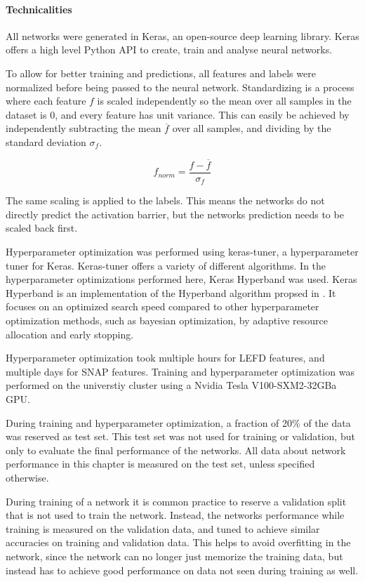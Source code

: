 \paragraph{Technicalities}

All networks were generated in Keras, an open-source deep learning library.
Keras offers a high level Python API to create, train and analyse neural networks.

To allow for better training and predictions, all features and labels were normalized before being passed to the neural network.
Standardizing is a process where each feature $f$ is scaled independently so the mean over all samples in the dataset is 0, 
and every feature has unit variance.
This can easily be achieved by independently subtracting the mean $\overline{f}$ over all samples, and dividing by the standard deviation $\sigma_f$.

$$
f_{norm} = \frac{f- \overline{f}}{\sigma_f}
$$

The same scaling is applied to the labels.
This means the networks do not directly predict the activation barrier, but the networks prediction needs to be scaled back first.

Hyperparameter optimization was performed using keras-tuner, a hyperparameter tuner for Keras.
Keras-tuner offers a variety of different algorithms.
In the hyperparameter optimizations performed here, Keras Hyperband was used.
Keras Hyperband is an  implementation of the Hyperband algorithm propsed in \cite{li2017hyperband}.
It focuses on an optimized search speed compared to other hyperparameter optimization methods, such as
bayesian optimization, by adaptive resource allocation and early stopping.

Hyperparameter optimization took multiple hours for LEFD features, 
and multiple days for SNAP features.
Training and hyperparameter optimization was performed on the universtiy cluster %
using a Nvidia Tesla V100-SXM2-32GBa GPU.

During training and hyperparameter optimization, a fraction of 20\% of the data was reserved as test set.
This test set was not used for training or validation, but only to evaluate the final performance of the networks.
All data about network performance in this chapter is measured on the test set, unless specified otherwise.

During training of a network it is common practice to reserve a validation split that is not used to train the network.
Instead, the networks performance while training is measured on the validation data, and tuned to achieve similar accuracies on
training and validation data.
This helps to avoid overfitting in the network, since the network can no longer just memorize the training
data, but instead has to achieve good performance on data not seen during training as well.

